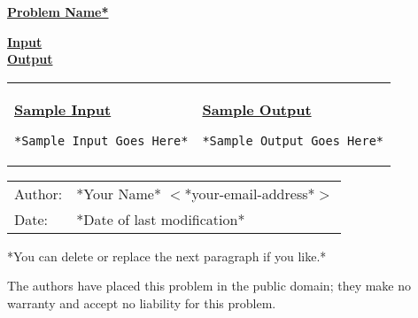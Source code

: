 \documentclass[12pt]{article}
\begin{document}
\newcommand{\problem}[1]{\underline{\Large \bf #1}}
\renewcommand{\section}[1]{\bigskip\underline{\bf #1}\\}
\newcommand{\header}[1]{\underline{\bf #1}}
\setlength{\parindent}{0.0in}
\setlength{\parskip}{1ex}

\problem{*Problem Name*}


\section{Input}


\section{Output}


\begin{center}
\begin{tabular}{l|l}
\begin{minipage}{2.5in}
\header{Sample Input}
\begin{verbatim}
*Sample Input Goes Here*
\end{verbatim}
\end{minipage}\hspace*{0.2in}
&
\hspace*{0.2in}\begin{minipage}{2.5in}
\header{Sample Output}
\begin{verbatim}
*Sample Output Goes Here*
\end{verbatim}
\end{minipage}
\end{tabular}
\end{center}

\bigskip

\begin{tabular}{ll}
Author:	      & *Your Name* $<$*your-email-address*$>$ \\
Date:         & *Date of last modification*
\end{tabular}

*You can delete or replace the next paragraph if you like.*

The authors have placed this problem in the public domain;
they make no warranty and accept no liability for this problem.
\end{document}
